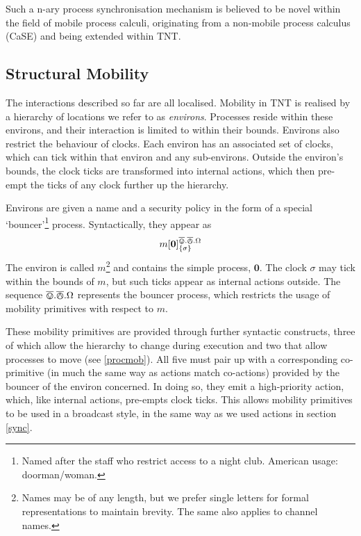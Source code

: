 \documentclass{sig-alternate}
\newcommand{\nil}{\textbf{0}}
\newcommand{\loc}[4]{{#1}[ #2 ]^{#3}_{\{#4\}}}
\newcommand{\bin}{\overline{\varovee}}
\newcommand{\bout}{\overline{\varowedge}}
\begin{document}
Such a n-ary process synchronisation mechanism is believed to be novel
within the field of mobile process calculi, originating from a
non-mobile process calculus (CaSE) and being extended within TNT.

\subsection{Structural Mobility}
\label{structmob}

The interactions described so far are all localised.  Mobility in TNT is
realised by a hierarchy of locations we refer to as \emph{environs}.
Processes reside within these environs, and their interaction is limited
to within their bounds.  Environs also restrict the behaviour of clocks.
Each environ has an associated set of clocks, which can tick within that
environ and any sub-environs.  Outside the environ's bounds, the clock
ticks are transformed into internal actions, which then pre-empt the
ticks of any clock further up the hierarchy.

Environs are given a name and a security policy in the form of a special
`bouncer'\footnote{Named after the staff who restrict access to a night
club.  American usage: doorman/woman.} process.  Syntactically, they
appear as
\begin{displaymath}
\loc{m}{\nil}{\bin.\bout.\Omega}{\sigma}
\end{displaymath}
The environ is called $m$\footnote{Names may be of any length, but we
 prefer single letters for formal representations to maintain brevity.
 The same also applies to channel names.} and contains the simple
 process, $\nil$.  The clock $\sigma$ may tick within the bounds of $m$,
 but such ticks appear as internal actions outside.  The sequence
 $\bin.\bout.\Omega$ represents the bouncer process, which restricts the
 usage of mobility primitives with respect to $m$.

These mobility primitives are provided through further syntactic
 constructs, three of which allow the hierarchy to change during
 execution and two that allow processes to move (see \ref{procmob}).
 All five must pair up with a corresponding co-primitive (in much the
 same way as actions match co-actions) provided by the bouncer of the
 environ concerned.  In doing so, they emit a high-priority action,
 which, like internal actions, pre-empts clock ticks.  This allows
 mobility primitives to be used in a broadcast style, in the same way as
 we used actions in section \ref{sync}.
\end{document}
